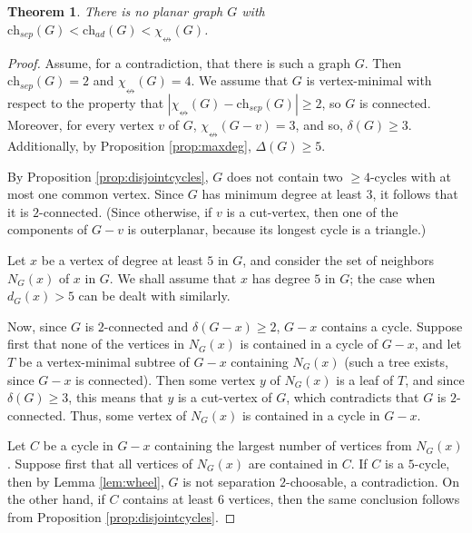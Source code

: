 \documentclass[12pt]{article}
\newtheorem{theorem}{Theorem}[section]
\newcommand{\single}{\chi_{\nleftrightarrow}}
\newcommand{\ch}{\mathrm{ch}}
\begin{document}
\begin{theorem}
\label{prop:noplanar}
    There is no planar graph $G$ with 
    $\ch_{sep}(G) < \ch_{ad}(G) < \single(G)$.
\end{theorem}
\begin{proof}
    Assume, for a contradiction, that there is such a graph $G$. 
    Then $\ch_{sep}(G)=2$
    and $\single(G) =4$. We assume that $G$ is vertex-minimal with 
    respect to the property that $|\single(G) - \ch_{sep}(G)| \geq 2$,
    so $G$ is connected. Moreover, for every vertex $v$ of $G$, 
    $\single(G-v)=3$, and so, $\delta(G) \geq 3$.
Additionally, 
    by Proposition \ref{prop:maxdeg}, $\Delta(G) \geq 5$.

By Proposition \ref{prop:disjointcycles},
$G$ does not contain two $\geq 4$-cycles with 
at most one common vertex. 
Since $G$ has minimum degree at least $3$, it follows that it 
is $2$-connected. (Since otherwise, if $v$ is a cut-vertex, then one of 
the components of $G-v$ is outerplanar, because its longest cycle is a 
triangle.)




Let $x$ be a vertex of degree at least $5$ in $G$, and consider the set 
of neighbors $N_G(x)$ of $x$ in $G$. We shall assume that $x$ has
degree $5$ in $G$; the case when $d_G(x) > 5$ can be dealt with 
similarly.


Now, since $G$ is $2$-connected and $\delta(G-x) \geq 2$,
$G-x$ contains a cycle. Suppose first that none of the vertices
in $N_G(x)$ is contained in a cycle of $G-x$, and let $T$ be a 
vertex-minimal subtree of $G-x$ containing $N_G(x)$ (such a tree exists,
since $G-x$ is connected). Then some vertex $y$ of $N_G(x)$ is a leaf of 
$T$, and since $\delta(G) \geq 3$, this means that $y$ is a cut-vertex 
of $G$, which contradicts that $G$ is $2$-connected. 
Thus, some vertex of $N_G(x)$ is contained in a cycle in $G-x$.

Let $C$ be a cycle in $G-x$ containing the largest number of vertices
from $N_G(x)$. 
Suppose first that all vertices of $N_G(x)$ are contained in $C$.
If $C$ is a $5$-cycle, then by Lemma \ref{lem:wheel}, 
$G$ is not separation
$2$-choosable, a contradiction. On the other hand, if $C$ contains at least $6$ vertices,
then the same conclusion follows from Proposition \ref{prop:disjointcycles}.


\end{proof}
\end{document}
